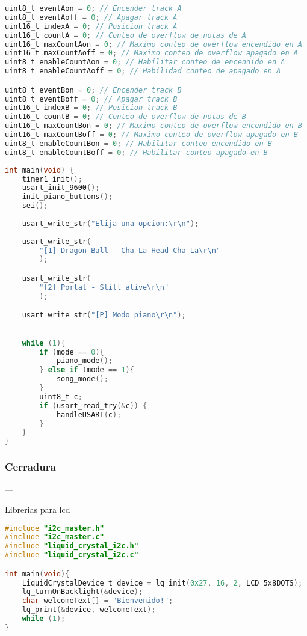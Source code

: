 \begin{lstlisting}[language=C, caption={Variables de control de flujo}]
uint8_t eventAon = 0; // Encender track A
uint8_t eventAoff = 0; // Apagar track A
uint16_t indexA = 0; // Posicion track A
uint16_t countA = 0; // Conteo de overflow de notas de A
uint16_t maxCountAon = 0; // Maximo conteo de overflow encendido en A
uint16_t maxCountAoff = 0; // Maximo conteo de overflow apagado en A
uint8_t enableCountAon = 0; // Habilitar conteo de encendido en A
uint8_t enableCountAoff = 0; // Habilidad conteo de apagado en A

uint8_t eventBon = 0; // Encender track B
uint8_t eventBoff = 0; // Apagar track B
uint16_t indexB = 0; // Posicion track B
uint16_t countB = 0; // Conteo de overflow de notas de B
uint16_t maxCountBon = 0; // Maximo conteo de overflow encendido en B
uint16_t maxCountBoff = 0; // Maximo conteo de overflow apagado en B
uint8_t enableCountBon = 0; // Habilitar conteo encendido en B
uint8_t enableCountBoff = 0; // Habilitar conteo apagado en B
\end{lstlisting}

\begin{lstlisting}[language=C, caption={Variables de control de flujo}]
int main(void) {
	timer1_init();
	usart_init_9600();
	init_piano_buttons();
	sei();
	
	usart_write_str("Elija una opcion:\r\n");
	
	usart_write_str(
		"[1] Dragon Ball - Cha-La Head-Cha-La\r\n"
		);

	usart_write_str(
		"[2] Portal - Still alive\r\n"
		);

	usart_write_str("[P] Modo piano\r\n");

	
	while (1){
		if (mode == 0){
			piano_mode();
		} else if (mode == 1){
			song_mode();
		}
	    uint8_t c;
	    if (usart_read_try(&c)) {
		    handleUSART(c);
	    }
	}
}
\end{lstlisting}

\subsubsection{Cerradura}---




Librerias para lcd
\begin{lstlisting}[language=C, caption={Librerias utilizadas para pantalla LCD}]
#include "i2c_master.h"
#include "i2c_master.c"
#include "liquid_crystal_i2c.h"
#include "liquid_crystal_i2c.c"

int main(void){
    LiquidCrystalDevice_t device = lq_init(0x27, 16, 2, LCD_5x8DOTS);
    lq_turnOnBacklight(&device);
	char welcomeText[] = "Bienvenido!";
	lq_print(&device, welcomeText);
    while (1);
}
\end{lstlisting}


